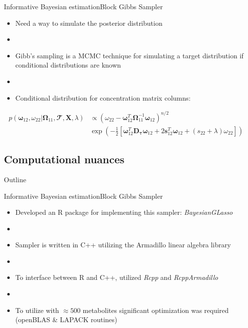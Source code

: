 \documentclass[xcolor=dvipsnames]{beamer}
\begin{document}
\begin{frame}{Informative Bayesian estimation}{Block Gibbs Sampler}
	\vspace{-10.5pt}
	\begin{itemize}
		\item Need a way to simulate the posterior distribution \pause
		\item[]
		\item Gibb's sampling is a MCMC technique for simulating a target distribution if conditional distributions are known \pause
		\item[]
		\item Conditional distribution for concentration matrix columns:
	\end{itemize}
	\begin{align*}
	p(\boldsymbol{\omega}_{12}, \omega_{22}|\boldsymbol{\Omega}_{11},\mathbfcal{T},\textbf{X},\lambda) & \propto \left(\omega_{22}-\boldsymbol{\omega}_{12}^T \boldsymbol{\Omega}_{11}^{-1}\boldsymbol{\omega}_{12} \right)^{n/2} \\ &\exp \left( - \frac{1}{2}\left[ \boldsymbol{\omega}_{12}^T \textbf{D}_{\boldsymbol{\tau}} \boldsymbol{\omega}_{12}+ 2 
	\textbf{s}_{12}^T \boldsymbol{\omega}_{12} + (s_{22}+\lambda)\omega_{22}\right] \right)
	\end{align*}
\end{frame}

\subsection{Computational nuances}

\begin{frame}{Outline}
\vspace{-10.5pt}
\tableofcontents[currentsection,subsectionstyle=show/shaded/hide]
\addtocounter{framenumber}{-1}
\end{frame}

\begin{frame}{Informative Bayesian estimation}{Block Gibbs Sampler}
	\vspace{-15.5pt}
	\begin{itemize}
		\item Developed an R package for implementing this sampler: \emph{BayesianGLasso} \pause
		\item[]
		\item Sampler is written in C++ utilizing the Armadillo linear algebra library \pause
		\item[]
		\item To interface between R and C++, utilized \emph{Rcpp} and \emph{RcppArmadillo} \pause
		\item[]
		\item To utilize with $\approx 500$ metabolites significant optimization was required (openBLAS \& LAPACK routines)
	\end{itemize}
\end{frame}
\end{document}
